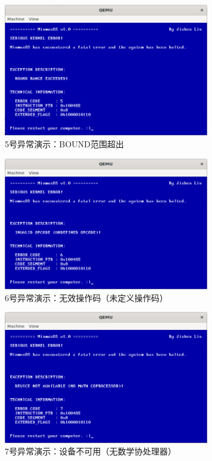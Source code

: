 \begin{figure}[htbp]
    \centering
    \includegraphics[width=0.8\textwidth]{figures/Exception5Presentation.png}
    \caption{5号异常演示：BOUND范围超出}
\end{figure}

\begin{figure}[htbp]
    \centering
    \includegraphics[width=0.8\textwidth]{figures/Exception6Presentation.png}
    \caption{6号异常演示：无效操作码（未定义操作码）}
\end{figure}

\begin{figure}[htbp]
    \centering
    \includegraphics[width=0.8\textwidth]{figures/Exception7Presentation.png}
    \caption{7号异常演示：设备不可用（无数学协处理器）}
\end{figure}

